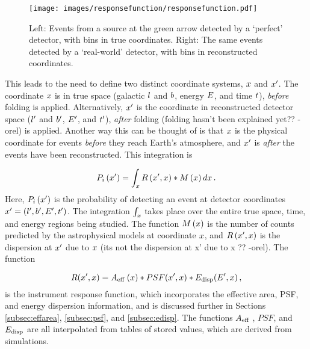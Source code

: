   \begin{figure}[!t]
    \centering
    \texttt{[image: images/responsefunction/responsefunction.pdf]}
    \caption[Response Function Dispersion]
    {
      Left: Events from a source at the green arrow detected by a `perfect' detector, with bins in true coordinates.
      Right: The same events detected by a `real-world' detector, with bins in reconstructed coordinates.
    }
    \label{fig:responsedispersion}
  \end{figure}
  
  This leads to the need to define two distinct coordinate systems, $x$ and $x'$.
  The coordinate $x$ is in true space (galactic $l$ and $b$, energy $E$, and time $t$), \textit{before} folding is applied.
  Alternatively, $x'$ is the coordinate in reconstructed detector space ($l'$ and $b'$, $E'$, and $t'$), \textit{after} {\color{red}folding (folding hasn't been explained yet?? -orel)} is applied.
  Another way this can be thought of is that $x$ is the physical coordinate for events \textit{before} they reach Earth's atmosphere, and $x'$ is \textit{after} the events have been reconstructed.
  This integration is
  
  \begin{equation}\label{eqn:folding}
    P_i \left( x' \right ) = \int_x R \left ( x', x \right ) * M \left ( x \right ) dx \,.
  \end{equation}
  Here, $P_i \left( x' \right )$ is the probability of detecting an event at detector coordinates $x' = \left ( l', b', E', t' \right )$.
  The integration $\int_x$ takes place over the entire true space, time, and energy regions being studied.
  The function $M\left ( x \right )$ is the number of counts predicted by the astrophysical models at coordinate $x$, and $R \left ( x', x \right )$ is the dispersion at $x'$ due to $x$ {\color{red}(its not the dispersion at x' due to x ?? -orel)}.
  The function
  
  \begin{equation}\label{eqn:foldingR}
    R(x',x) = A_\textrm{eff }(x) * PSF(x',x) * E_\textrm{disp}(E',x) \,,
  \end{equation}
  is the instrument response function, which incorporates the effective area, PSF, and energy dispersion information, and is discussed further in Sections \ref{subsec:effarea}, \ref{subsec:psf}, and \ref{subsec:edisp}.
  The functions $A_\textrm{eff }$, $PSF$, and $E_\textrm{disp}$ are all interpolated from tables of stored values, which are derived from simulations.

